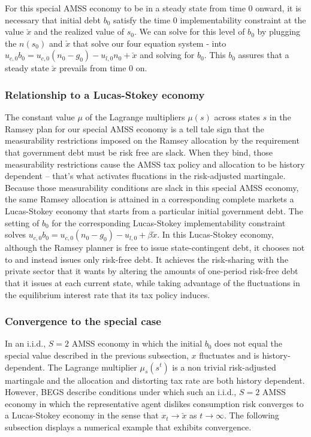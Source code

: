 For this special AMSS economy to be in a steady state from time $0$ onward, it is necessary that  initial debt $b_0$ satisfy the
time $0$ implementability
constraint  at the value $\check x$ and the realized value of $s_0$.  We can solve for this level of $b_0$ by
plugging the $n(s_0)$ and $\check x$
that solve our four equation system  -  into
$ u_{c,0} b_0 = u_{c,0} (n_0-g_0) - u_{l,0} n_0 + \check x $ and solving for $b_0$.
This  $b_0$ assures that a steady state $\check x$ prevails from time $0$ on.


\subsubsection{Relationship to a Lucas-Stokey economy}
The constant value $\mu$ of the Lagrange multipliers $\mu(s)$ across states $s$  in the Ramsey plan for our special AMSS economy is a tell tale sign that
the measurability restrictions imposed on the Ramsey allocation by the requirement that government debt must be risk free are slack.
When they bind, those
measurability restrictions  cause the AMSS tax policy and allocation to be history dependent -- that's what activates flucations in the risk-adjusted martingale.
Because  those measurability conditions are  slack in  this special AMSS economy, the same Ramsey allocation is attained in a corresponding complete markets
 a Lucas-Stokey economy that starts
from a particular initial  government debt.  The setting of  $b_0$ for the corresponding Lucas-Stokey
implementability constraint  solves
$ u_{c,0} b_0 = u_{c,0}(n_0 - g_0) - u_{l,0} + \beta \check x$.
In this Lucas-Stokey economy, although the Ramsey planner is free to issue state-contingent debt, it chooses not to and instead  issues  only risk-free debt.
It achieves the
 risk-sharing with the private sector that it wants by altering the amounts of one-period risk-free debt that it issues at each current state,
  while taking advantage of  the fluctuations in the  equilibrium interest
rate that its tax policy induces.

\subsubsection{Convergence to the special case}
In an  i.i.d., $S=2$  AMSS economy in which  the initial $b_0$ does not equal the special value described in the previous subsection, $x$ fluctuates and is history-dependent.
The Lagrange multiplier $\mu_s(s^t)$ is a non trivial risk-adjusted martingale and the allocation and distorting tax rate
are both  history dependent.  However, BEGS describe conditions  under which such an i.i.d., $S=2$ AMSS economy in which
the representative agent dislikes consumption risk  converges to a
Lucas-Stokey economy in the sense that $x_t \rightarrow \check x$ as $t \rightarrow \infty$.
The  following subsection  displays a numerical example that exhibits convergence.



